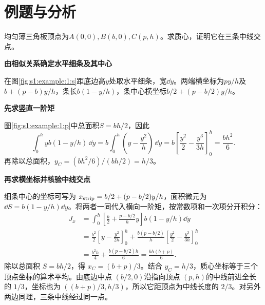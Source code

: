 \section{例题与分析}

\begin{question}\begin{example}[均匀三角板的质心]\label{s1:example:1}
均匀薄三角板顶点为$A(0,0),B(b,0),C(p,h)$。求质心，证明它在三条中线交点。
\end{example}
\end{question}
\begin{solution}\textbf{由相似关系确定水平细条及其中心}\par\nobreak
在图\ref{fig:s1:example:1:s}距底边高$y$处取水平细条，宽$\dd y$。两端横坐标为$py/h$及$b+(p-b)y/h$，条长$b(1-y/h)$，条中心横坐标$b/2+(p-b/2)y/h$。



\par\medskip{}\noindent\textbf{先求竖直一阶矩}\par\nobreak
图\ref{fig:s1:example:1:p}中总面积$S=bh/2$，因此
\[
\int_0^h yb(1-y/h)\,\dd y
=b\int_0^h\left(y-\frac{y^2}{h}\right)\,\dd y
=b\left[\frac{y^2}{2}-\frac{y^3}{3h}\right]_0^h
=\frac{bh^2}{6}.
\]
再除以总面积，$y_C=(bh^2/6)/(bh/2)=h/3$。


\par\medskip{}\noindent\textbf{再求横坐标并核验中线交点}\par\nobreak
细条中心的坐标可写为 $x_{\rm strip}=b/2+(p-b/2)y/h$，面积微元为 $\dd S=b(1-y/h)\dd y$。将两者一同代入横向一阶矩，按常数项和一次项分开积分：
\begin{align*}
 J_x&=\int_0^h\left[\frac b2+\frac{p-b/2}{h}y\right]
 b(1-y/h)\dd y\\
 &=\frac{b^2}{2}\left[y-\frac{y^2}{2h}\right]_0^h
 +\frac{b(p-b/2)}h\left[\frac{y^2}{2}-\frac{y^3}{3h}\right]_0^h\\
 &=\frac{b^2h}{4}+\frac{b(p-b/2)h}{6}
 =\frac{bh(b+p)}6.
\end{align*}
除以总面积 $S=bh/2$，得 $x_C=(b+p)/3$。结合 $y_C=h/3$，质心坐标等于三个顶点坐标的算术平均。由底边中点 $(b/2,0)$沿指向顶点 $(p,h)$的中线前进全长的 $1/3$，坐标也为 $((b+p)/3,h/3)$，所以它距顶点为中线长度的 $2/3$。对另外两边同理，三条中线经过同一点。\end{solution}

